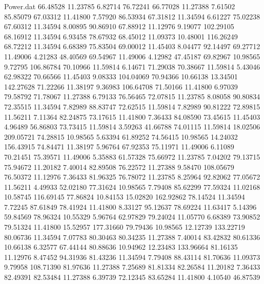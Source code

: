 \begin{filecontents}{Power.dat}
  66.48528   11.23785    6.82714   76.72241
  66.77028   11.27388    7.61502   85.85079
  67.03312   11.41800    7.57920   86.53934
  67.31812   11.34594    6.61227   75.02238
  67.60312   11.34594    8.00895   90.86910
  67.88912   11.12976    9.19077  102.29105
  68.16912   11.34594    6.93458   78.67932
  68.45012   11.09373   10.48001  116.26249
  68.72212   11.34594    6.68389   75.83504
  69.00012   11.45403    8.04477   92.14497
  69.27712   11.49006    4.21283   48.40569
  69.54967   11.49006    4.12982   47.45187
  69.82967   10.98565    9.72795  106.86784
  70.10966   11.59814    6.14671   71.29038
  70.38667   11.59814    5.43046   62.98322
  70.66566   11.45403    9.08333  104.04069
  70.94366   10.66138   13.34501  142.27628
  71.22266   11.38197    9.36983  106.64708
  71.50166   11.41800    6.97039   79.58792
  71.78067   11.27388    6.79133   76.56465
  72.07815   11.23785    8.08058   90.80834
  72.35515   11.34594    7.82989   88.83747
  72.62515   11.59814    7.82989   90.81222
  72.89815   11.56211    7.11364   82.24875
  73.17615   11.41800    7.36433   84.08590
  73.45615   11.45403    4.96489   56.86803
  73.73415   11.59814    3.59263   41.66788
  74.01115   11.59814   18.02506  209.05721
  74.28815   10.98565    5.63394   61.89252
  74.56415   10.98565   14.24032  156.43915
  74.84471   11.38197    5.96764   67.92353
  75.11971   11.49006    6.11089   70.21451
  75.39571   11.49006    5.35883   61.57328
  75.66972   11.23785    7.04202   79.13715
  75.94672   11.20182    7.40014   82.89508
  76.22572   11.27388    9.58470  108.05679
  76.50372   11.12976    7.36433   81.96325
  76.78072   11.23785    8.25964   92.82062
  77.05672   11.56211    4.49933   52.02180
  77.31624   10.98565    7.79408   85.62299
  77.59324   11.02168   10.58745  116.69145
  77.86824   10.84153   15.02820  162.92862
  78.14524   11.34594    7.72245   87.61849
  78.41924   11.41800    8.33127   95.12637
  78.69224   11.63417    5.14396   59.84569
  78.96324   10.55329    5.96764   62.97829
  79.24024   11.05770    6.68389   73.90852
  79.51324   11.41800   15.52957  177.31660
  79.79436   10.98565   12.12739  133.22719
  80.06736   11.34594    7.07783   80.30463
  80.34235   11.27388    7.40014   83.42832
  80.61336   10.66138    6.32577   67.44144
  80.88636   10.94962   12.23483  133.96664
  81.16135   11.12976    8.47452   94.31936
  81.43236   11.34594    7.79408   88.43114
  81.70636   11.09373    9.79958  108.71390
  81.97636   11.27388    7.25689   81.81334
  82.26584   11.20182    7.36433   82.49391
  82.53484   11.27388    6.39739   72.12345
  83.65284   11.41800    4.10540   46.87539

\end{filecontents}
